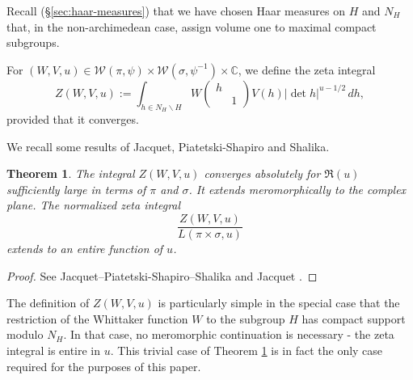 \documentclass[reqno]{amsart}
\theoremstyle{plain} \newtheorem{theorem} {Theorem}
\theoremstyle{definition} \newtheorem{definition} [theorem] {Definition}
\theoremstyle{itplain} %
\numberwithin{equation}{section}
\numberwithin{theorem}{section}
\begin{document}
Recall (\S\ref{sec:haar-measures}) that we have chosen Haar measures on $H$ and $N_H$ that, in the non-archimedean case, assign volume one to maximal compact subgroups.

For $(W,V,u) \in \mathcal{W}(\pi,\psi) \times \mathcal{W}(\sigma,\psi^{-1}) \times \mathbb{C}$, we define the zeta integral
\[
  Z(W, V, u) := \int _{h \in N_H \backslash H} W
  \begin{pmatrix}
    h &  \\
    & 1
  \end{pmatrix}
  V(h) |\det h|^{u-1/2} \, d h,
\]
provided that it converges. 

We recall some results of Jacquet, Piatetski-Shapiro and Shalika.
\begin{theorem}\label{thm:local-zeta-rankin-selberg-meromorphic-continuation}
  The integral $Z(W,V,u)$ converges absolutely for $\Re(u)$ sufficiently large in terms of $\pi$ and $\sigma$.  It extends meromorphically to the complex plane.  The normalized zeta integral
  \[
    \frac{Z(W,V,u)}{L(\pi \times \sigma, u)}
  \]
  extends to an entire function of $u$.
\end{theorem}
\begin{proof}
  See  Jacquet--Piatetski-Shapiro--Shalika \cite[\S2.7]{MR701565} and Jacquet \cite[\S5, \S8.1]{MR2533003}.
\end{proof}
The definition of $Z(W,V,u)$ is particularly simple in the special case that the restriction of the Whittaker function $W$ to the subgroup $H$ has compact support modulo $N_H$.  In that case, no meromorphic continuation is necessary - the zeta integral is entire in $u$.  This trivial case of Theorem \ref{thm:local-zeta-rankin-selberg-meromorphic-continuation} is in fact the only case required for the purposes of this paper.
\end{document}
